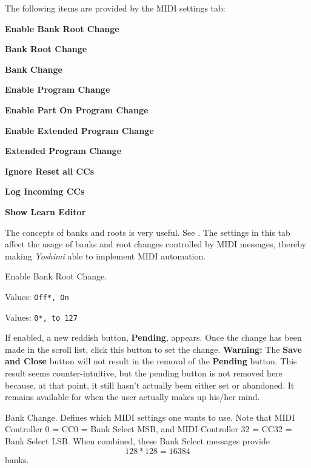    The following items are provided by the MIDI settings tab:

   \begin{enumber}
      \item \textbf{Enable Bank Root Change}
      \item \textbf{Bank Root Change}
      \item \textbf{Bank Change}
      \item \textbf{Enable Program Change}
      \item \textbf{Enable Part On Program Change}
      \item \textbf{Enable Extended Program Change}
      \item \textbf{Extended Program Change}
      \item \textbf{Ignore Reset all CCs}
      \item \textbf{Log Incoming CCs}
      \item \textbf{Show Learn Editor}
   \end{enumber}

   \setcounter{ItemCounter}{0}      %

   The concepts of banks and roots is very useful.
   See .
   The settings in this tab affect the usage of banks and root changes
   controlled by MIDI messages, thereby making \textsl{Yoshimi} able to
   implement MIDI automation.

   Enable Bank Root Change.

   Values: \texttt{Off*, On}


   Values: \texttt{0*, to 127}

   If enabled, a new reddish button, \textbf{Pending}, appears.
   Once the change has been made in the scroll list, click this button
   to set the change.
   \textbf{Warning:}
   The \textbf{Save and Close} button will not result in the removal of the
   \textbf{Pending} button.
   This result seems counter-intuitive, but the pending button is not removed
   here because, at that point, it still hasn't actually been either set or
   abandoned. It remains available for when the user actually makes up his/her
   mind.

   Bank Change.
   Defines which MIDI settings one wants to use.
   Note that MIDI Controller 0 = CC0 = Bank Select MSB, and MIDI Controller
   32 = CC32 = Bank Select LSB.
   When combined, these Bank Select messages provide \[128*128 = 16384\]
   banks.

